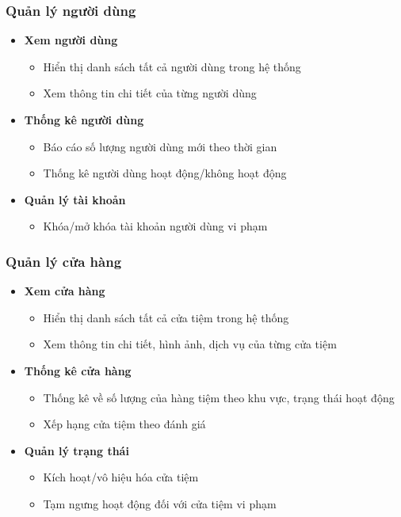 \subsubsection{ Quản lý người dùng}
\begin{itemize}
    \item \textbf{Xem người dùng}
    \begin{itemize}
        \item Hiển thị danh sách tất cả người dùng trong hệ thống
        \item Xem thông tin chi tiết của từng người dùng
    \end{itemize}
    
    \item \textbf{Thống kê người dùng}
    \begin{itemize}
        \item Báo cáo số lượng người dùng mới theo thời gian
        \item Thống kê người dùng hoạt động/không hoạt động
    \end{itemize}
    
    \item \textbf{Quản lý tài khoản}
    \begin{itemize}
        \item Khóa/mở khóa tài khoản người dùng vi phạm
    \end{itemize}
\end{itemize}

\subsubsection{Quản lý cửa hàng}
\begin{itemize}
    \item \textbf{Xem cửa hàng}
    \begin{itemize}
        \item Hiển thị danh sách tất cả cửa tiệm trong hệ thống
        \item Xem thông tin chi tiết, hình ảnh, dịch vụ của từng cửa tiệm
    \end{itemize}
    
    \item \textbf{Thống kê cửa hàng}
    \begin{itemize}
        \item Thống kê về số lượng của hàng tiệm theo khu vực, trạng thái hoạt động
        \item Xếp hạng cửa tiệm theo đánh giá
    \end{itemize}
    
    \item \textbf{Quản lý trạng thái}
    \begin{itemize}
        \item Kích hoạt/vô hiệu hóa cửa tiệm
        \item Tạm ngưng hoạt động đối với cửa tiệm vi phạm
    \end{itemize}
\end{itemize}

